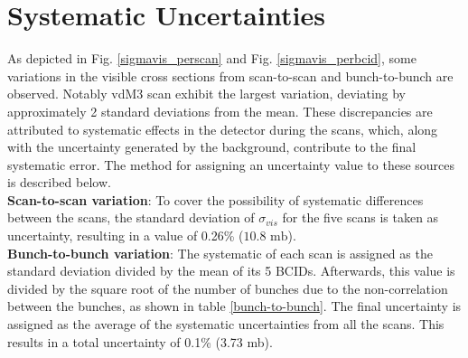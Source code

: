 \section{Systematic Uncertainties}
As depicted in Fig. \ref{sigmavis_perscan} and Fig. \ref{sigmavis_perbcid}, some variations in the visible cross sections from scan-to-scan and bunch-to-bunch are observed. Notably vdM3 scan exhibit the largest variation, deviating by approximately 2 standard deviations from the mean. These discrepancies are attributed to systematic effects in the detector during the scans, which, along with the uncertainty generated by the background, contribute to the final systematic error. The method for assigning an uncertainty value to these sources is described below.\\ 

\textbf{Scan-to-scan variation}: To cover the possibility of systematic differences between the scans, the standard deviation of $\sigma_{vis}$ for the five  scans is taken as uncertainty, resulting in a value of  0.26\% ($10.8 \text{ mb}$).\\

\textbf{Bunch-to-bunch variation}: The systematic of each scan is assigned as the standard deviation divided by the mean of its 5 BCIDs. Afterwards, this value is divided by the square root of the number of bunches due to the non-correlation between the bunches, as shown in table \ref{bunch-to-bunch}. The final uncertainty is assigned as the average of the systematic uncertainties from all the scans. This results in a total uncertainty of 0.1\% (3.73 mb).\\

